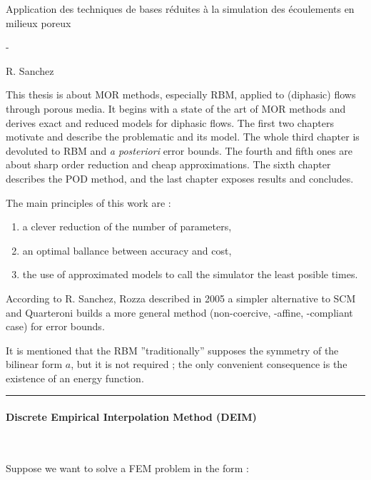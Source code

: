 \documentclass[a4paper]{article}
\begin{document}
\begin{center}\Large\sc
Application des techniques de bases réduites à la simulation des écoulements en milieux poreux


\large-
 

R. Sanchez\end{center}

\bigskip

This thesis is about MOR methods, especially RBM, applied to (diphasic) flows through porous media. It begins with a state of the art of MOR methods and derives exact and reduced models for diphasic flows. The first two chapters motivate and describe the problematic and its model. The whole third chapter is devoluted to RBM and \emph{a posteriori} error bounds. The fourth and fifth ones are about sharp order reduction and cheap approximations. The sixth chapter describes the POD method, and the last chapter exposes results and concludes.


The main principles of this work are :
\begin{enumerate}
\item a clever reduction of the number of parameters,
\item an optimal ballance between accuracy and cost,
\item the use of approximated models to call the simulator the least posible times.
\end{enumerate}


According to R. Sanchez, Rozza described in 2005 a simpler alternative to SCM  and Quarteroni builds a more general method (non-coercive, -affine, -compliant case) for error bounds.


It is mentioned that the RBM ''traditionally'' supposes the symmetry of the bilinear form $a$, but it is not required ; the only convenient consequence is the existence of an energy function.

\bigskip

\begin{center}\rule{6cm}{0.2pt}\end{center}

\bigskip

\paragraph{Discrete Empirical Interpolation Method (DEIM)}~


\bigskip

Suppose we want to solve a FEM problem in the form :
\end{document}
